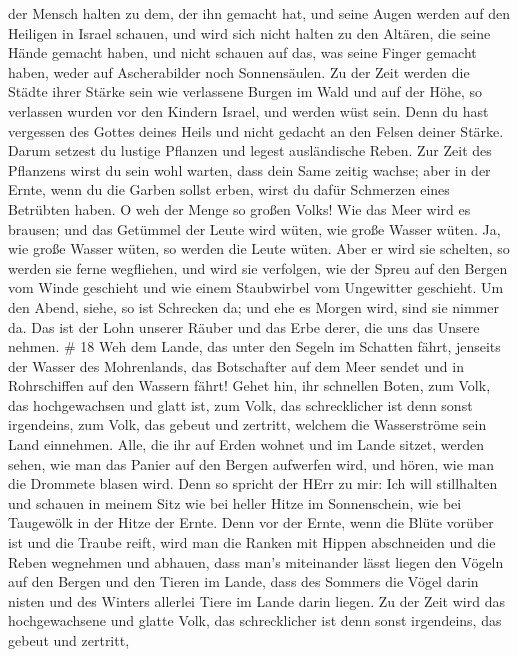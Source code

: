 der Mensch halten zu dem, der ihn gemacht hat, und seine Augen werden
auf den Heiligen in Israel schauen,  und wird sich nicht
halten zu den Altären, die seine Hände gemacht haben, und nicht schauen
auf das, was seine Finger gemacht haben, weder auf Ascherabilder noch
Sonnensäulen.  Zu der Zeit werden die Städte ihrer Stärke
sein wie verlassene Burgen im Wald und auf der Höhe, so verlassen wurden
vor den Kindern Israel, und werden wüst sein.  Denn du hast
vergessen des Gottes deines Heils und nicht gedacht an den Felsen deiner
Stärke. Darum setzest du lustige Pflanzen und legest ausländische Reben.
 Zur Zeit des Pflanzens wirst du sein wohl warten, dass
dein Same zeitig wachse; aber in der Ernte, wenn du die Garben sollst
erben, wirst du dafür Schmerzen eines Betrübten haben.  O
weh der Menge so großen Volks! Wie das Meer wird es brausen; und das
Getümmel der Leute wird wüten, wie große Wasser wüten.  Ja,
wie große Wasser wüten, so werden die Leute wüten. Aber er wird sie
schelten, so werden sie ferne wegfliehen, und wird sie verfolgen, wie
der Spreu auf den Bergen vom Winde geschieht und wie einem Staubwirbel
vom Ungewitter geschieht.  Um den Abend, siehe, so ist
Schrecken da; und ehe es Morgen wird, sind sie nimmer da. Das ist der
Lohn unserer Räuber und das Erbe derer, die uns das Unsere nehmen. \# 18
 Weh dem Lande, das unter den Segeln im Schatten fährt,
jenseits der Wasser des Mohrenlands,  das Botschafter auf
dem Meer sendet und in Rohrschiffen auf den Wassern fährt! Gehet hin,
ihr schnellen Boten, zum Volk, das hochgewachsen und glatt ist, zum
Volk, das schrecklicher ist denn sonst irgendeins, zum Volk, das gebeut
und zertritt, welchem die Wasserströme sein Land einnehmen. 
Alle, die ihr auf Erden wohnet und im Lande sitzet, werden sehen, wie
man das Panier auf den Bergen aufwerfen wird, und hören, wie man die
Drommete blasen wird.  Denn so spricht der HErr zu mir: Ich
will stillhalten und schauen in meinem Sitz wie bei heller Hitze im
Sonnenschein, wie bei Taugewölk in der Hitze der Ernte. 
Denn vor der Ernte, wenn die Blüte vorüber ist und die Traube reift,
wird man die Ranken mit Hippen abschneiden und die Reben wegnehmen und
abhauen,  dass man's miteinander lässt liegen den Vögeln auf
den Bergen und den Tieren im Lande, dass des Sommers die Vögel darin
nisten und des Winters allerlei Tiere im Lande darin liegen.
 Zu der Zeit wird das hochgewachsene und glatte Volk, das
schrecklicher ist denn sonst irgendeins, das gebeut und zertritt,
